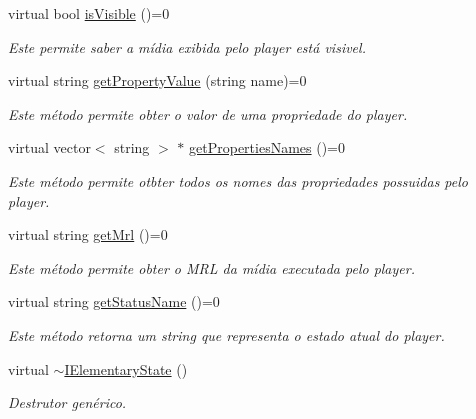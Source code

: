 \begin{DoxyCompactItemize}
virtual bool \hyperlink{classbr_1_1ufscar_1_1lince_1_1ginga_1_1wac_1_1state_1_1IElementaryState_a64cd15f7d8434054345243d877ede453}{isVisible} ()=0
\begin{DoxyCompactList}\small\item\em Este permite saber a mídia exibida pelo player está visivel. \item\end{DoxyCompactList}\item 
virtual string \hyperlink{classbr_1_1ufscar_1_1lince_1_1ginga_1_1wac_1_1state_1_1IElementaryState_a01bae35ea4efe31c179e81db8fb8a126}{getPropertyValue} (string name)=0
\begin{DoxyCompactList}\small\item\em Este método permite obter o valor de uma propriedade do player. \item\end{DoxyCompactList}\item 
virtual vector$<$ string $>$ $\ast$ \hyperlink{classbr_1_1ufscar_1_1lince_1_1ginga_1_1wac_1_1state_1_1IElementaryState_a68c7e2ba58623cea860d6de1fc7112e7}{getPropertiesNames} ()=0
\begin{DoxyCompactList}\small\item\em Este método permite otbter todos os nomes das propriedades possuidas pelo player. \item\end{DoxyCompactList}\item 
virtual string \hyperlink{classbr_1_1ufscar_1_1lince_1_1ginga_1_1wac_1_1state_1_1IElementaryState_a5fae9abe330000d369a739626d089a87}{getMrl} ()=0
\begin{DoxyCompactList}\small\item\em Este método permite obter o MRL da mídia executada pelo player. \item\end{DoxyCompactList}\item 
virtual string \hyperlink{classbr_1_1ufscar_1_1lince_1_1ginga_1_1wac_1_1state_1_1IElementaryState_abeabe720e157120f97d6a911460f6d71}{getStatusName} ()=0
\begin{DoxyCompactList}\small\item\em Este método retorna um string que representa o estado atual do player. \item\end{DoxyCompactList}\item 
virtual \hyperlink{classbr_1_1ufscar_1_1lince_1_1ginga_1_1wac_1_1state_1_1IElementaryState_ae16e3a178e9c9b147bc0a02b5ddaf4e6}{$\sim$IElementaryState} ()
\begin{DoxyCompactList}\small\item\em Destrutor genérico. \item\end{DoxyCompactList}\end{DoxyCompactItemize}
